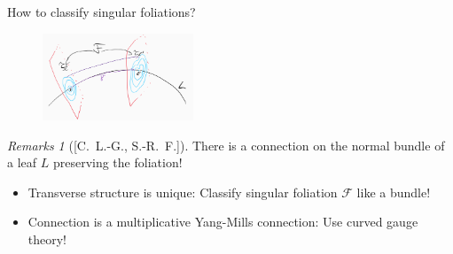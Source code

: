 \documentclass[
aspectratio=3218, 
10pt, hyperref={pdfpagelabels=false}]{beamer}
\theoremstyle{plain}
\theoremstyle{remark}
\newtheorem*{remark}{Remarks}
\begin{document}
\begin{frame}{How to classify singular foliations?}
\begin{figure}[htbp]
	\centering
		\includegraphics[width=0.4\textwidth]{Foliation connection.png}
	\label{fig:Foliation connection Zwei}
\end{figure}

\begin{remark}[{[C.\ L.-G., S.-R.\ F.]}]
There is a connection on the normal bundle of a leaf $L$ preserving the foliation!
\begin{itemize}
	\item Transverse structure is unique: Classify singular foliation $\mathcal{F}$ like a bundle!
	\item Connection is a multiplicative Yang-Mills connection: Use curved gauge theory!
\end{itemize}
\end{remark}

\end{frame}
\end{document}
